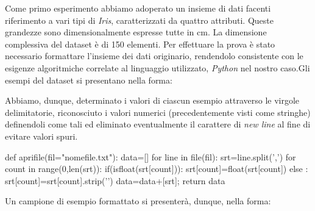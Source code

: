 		Come primo esperimento abbiamo adoperato un insieme di dati facenti riferimento a vari tipi di \emph{Iris}, caratterizzati da quattro attributi.
		Queste grandezze sono dimensionalmente espresse tutte in cm. La dimensione complessiva del dataset è di 150 elementi. Per effettuare la prova è stato necessario formattare l'insieme dei dati originario, rendendolo consistente con le esigenze algoritmiche correlate al linguaggio utilizzato, \emph{Python} nel nostro caso.\newline Gli esempi del dataset si presentano nella forma:
		
		Abbiamo, dunque, determinato i valori di ciascun esempio attraverso le virgole delimitatorie, riconosciuto i valori numerici (precedentemente visti come stringhe) definendoli come tali ed eliminato eventualmente il carattere di \textit{new line} al fine di evitare valori spuri.
		\medskip
		\begin{python}
		def aprifile(fil="nomefile.txt"):
			data=[]
			for line in file(fil):
				srt=line.split(',')
				for count in range(0,len(srt)):
					if(isfloat(srt[count])):
						srt[count]=float(srt[count])
					else :
						srt[count]=srt[count].strip('\n')
				data=data+[srt];
			return data
		\end{python}
		\bigskip
		Un campione di esempio formattato si presenterà, dunque, nella forma:
		
		
